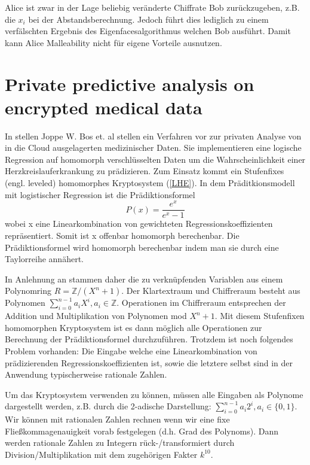 Alice ist zwar in der Lage beliebig veränderte Chiffrate Bob zurückzugeben, z.B. die $x_i$ bei der Abstandsberechnung. Jedoch führt dies lediglich zu einem verfälschten Ergebnis des Eigenfacesalgorithmus welchen Bob ausführt. Damit kann Alice Malleability nicht für eigene Vorteile ausnutzen.

\section{Private predictive analysis on encrypted medical data}
\label{PAMD}
In \cite{bos2014private} stellen Joppe W. Bos et. al stellen ein Verfahren vor zur privaten Analyse von in die Cloud ausgelagerten medizinischer Daten. Sie implementieren eine logische Regression auf homomorph verschlüsselten Daten um die Wahrscheinlichkeit einer Herzkreislauferkrankung zu prädizieren. Zum Einsatz kommt ein Stufenfixes (engl. leveled) homomorphes Kryptosystem (\ref{LHE}).
In dem Präditkionsmodell mit logistischer Regression ist die Prädiktionsformel
\begin{equation*}
P(x) = \frac{e^x}{e^x-1}
\end{equation*}
wobei x eine Linearkombination von gewichteten Regressionskoeffizienten repräsentiert. Somit ist x offenbar homomorph berechenbar. Die Prädiktionsformel wird homomorph berechenbar indem man sie durch eine Taylorreihe annähert.

In Anlehnung an \cite{bos2013improved} \cite{naehrig2011can} stammen daher die zu verknüpfenden Variablen aus einem Polynomring $R=\mathbb{Z}/(X^n+1)$. Der Klartextraum und Chiffreraum besteht aus Polynomen $\sum_{i=0}^{n-1} a_i X^i, a_i\in\mathbb{Z}$. Operationen im Chiffreraum entsprechen der Addition und Multiplikation von Polynomen mod $X^n+1$. Mit diesem Stufenfixen homomorphen Kryptosystem ist es dann möglich alle Operationen zur Berechnung der Prädiktionsformel durchzuführen. Trotzdem ist noch folgendes Problem vorhanden: Die Eingabe welche eine Linearkombination von prädizierenden Regressionskoeffizienten ist, sowie die letztere selbst sind in  der Anwendung typischerweise rationale Zahlen.

Um das Kryptosystem verwenden zu können, müssen alle Eingaben als Polynome dargestellt werden, z.B. durch die 2-adische Darstellung: $\sum_{i=0}^{n-1} a_i 2^i, a_i\in\{0,1\}$. Wir können mit rationalen Zahlen rechnen wenn wir eine fixe Fließkommagenauigkeit vorab festgelegen (d.h. Grad des Polynoms). Dann werden rationale Zahlen zu Integern rück-/transformiert durch Division/Multiplikation mit dem zugehörigen Fakter $k^{10}$.

